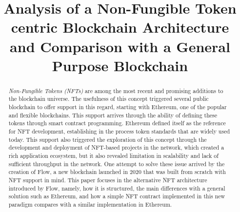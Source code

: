 \documentclass[conference]{IEEEtran}
\begin{document}
\title{Analysis of a Non-Fungible Token centric Blockchain Architecture and Comparison with a General Purpose Blockchain}

\author{
    \and
    \and
    \and
}

\maketitle

\begin{abstract}
    \textit{Non-Fungible Tokens (NFTs)} are among the most recent and promising additions to the blockchain universe. The usefulness of this concept triggered several public blockchain to offer support in this regard, starting with Ethereum, one of the popular and flexible blockchains. This support arrives through the ability of defining these tokens through smart contract programming. Ethereum defined itself as the reference for NFT development, establishing in the process token standards that are widely used today. This support also triggered the exploration of this concept through the development and deployment of NFT-based projects in the network, which created a rich application ecosystem, but it also revealed limitation in scalability and lack of sufficient throughput in the network. One attempt to solve these issue arrived by the creation of Flow, a new blockchain launched in 2020 that was built from scratch with NFT support in mind. This paper focuses in the alternative NFT architecture introduced by Flow, namely, how it is structured, the main differences with a general solution such as Ethereum, and how a simple NFT contract implemented in this new paradigm compares with a similar implementation in Ethereum.
\end{abstract}
\end{document}
